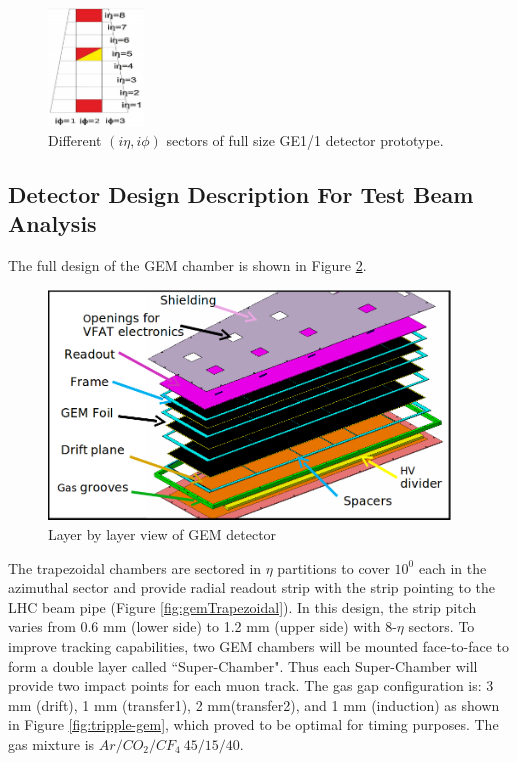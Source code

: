 \begin{figure}[!htbp]
\centering
\includegraphics[width=1.0in]{figures/GEM/GE11.png}
\caption{Different $(i\eta,i\phi)$ sectors of full size GE1/1 detector prototype.}
\label{GE11}
\end{figure}


\subsection{Detector Design Description For Test Beam Analysis}
The full design of the GEM chamber is shown in Figure \ref{fig:ge11}.
\begin{figure}[!htbp]
	\begin{center}
		\includegraphics[width=0.95\textwidth]{figures/GEM/ge11cad.png}
		\caption{Layer by layer view of GEM detector}
		\label{fig:ge11}
	\end{center}
\end{figure} 
The trapezoidal chambers are sectored in $\eta$ partitions to cover $10^0$ each in the azimuthal sector and provide radial readout strip with the strip pointing to the LHC beam pipe (Figure \ref{fig:gemTrapezoidal}). In this design, the strip pitch varies from 0.6 mm (lower side) to 1.2 mm (upper side) with 8-$\eta$ sectors. To improve tracking capabilities, two GEM chambers will be mounted face-to-face to form a double layer called ``Super-Chamber". Thus each Super-Chamber will provide two impact points for each muon track. The gas gap configuration is: 3 mm (drift), 1 mm (transfer1), 2 mm(transfer2), and 1 mm (induction) as shown in Figure \ref{fig:tripple-gem}, which proved to be optimal for timing purposes. The gas mixture is $Ar/CO_2/CF_4~45/15/40$.
